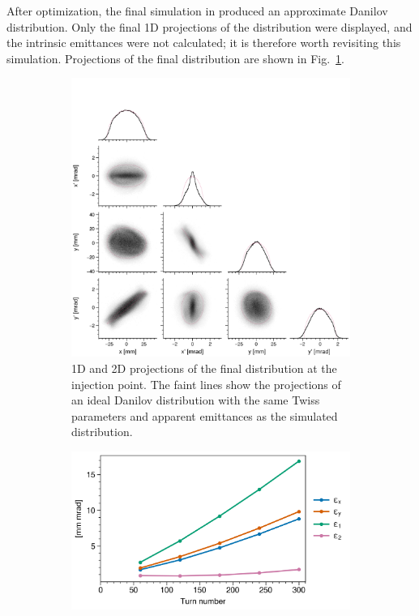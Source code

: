 After optimization, the final simulation in \cite{Holmes2018} produced an approximate Danilov distribution. Only the final 1D projections of the distribution were displayed, and the intrinsic emittances were not calculated; it is therefore worth revisiting this simulation. Projections of the final distribution are shown in Fig.~\ref{fig:Holmes_corner_compare}.
%
\begin{figure}[!p]
    \centering
    \begin{subfigure}{0.8\textwidth}
        \includegraphics[width=\textwidth]{Images/chapter3/Holmes_corner_compare.png}
        \caption{1D and 2D projections of the final distribution at the injection point. The faint lines show the projections of an ideal Danilov distribution with the same Twiss parameters and apparent emittances as the simulated distribution.}
        \label{fig:Holmes_corner_compare}
    \end{subfigure}
    \vfill
    \vspace*{1.25cm}
    \vfill
    \begin{subfigure}{0.5\textwidth}
        \includegraphics[width=\textwidth]{Images/chapter3/Holmes_emittances.png}

\end{subfigure}
\end{figure}
